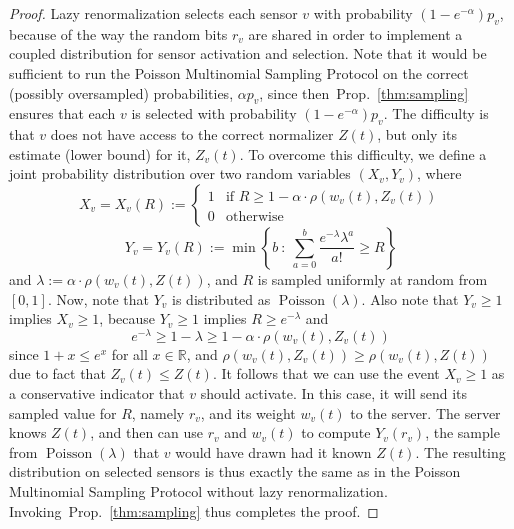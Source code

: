 \documentclass{sig-alternate-dan}
\numberwithin{equation}{section}
\newcommand{\sensor}{\ensuremath{v}}
\newcommand{\Poisson}[1]{\ensuremath{\operatorname{Poisson}({#1})}}
\newcommand{\LimitProtocol}[0]{Poisson Multinomial Sampling
  Protocol\xspace}
\newcommand{\propref}[1]{Prop.~\ref{#1}}
\newcommand{\reals}{\ensuremath{\mathbb{R}}}
\newcommand{\set}[1]{\ensuremath{\left\{#1\right\}}}
\begin{document}
{\begin{proof}
Lazy renormalization
selects each sensor $\sensor$ with probability
$(1-e^{-\alpha})p_{\sensor}$, because of the way the random bits
$r_{\sensor}$ are shared in order to implement a coupled distribution for
sensor activation and selection.
Note that it would be sufficient to run the \LimitProtocol on the correct (possibly
oversampled) probabilities, $\alpha p_{\sensor}$, 
since then~\propref{thm:sampling} ensures that each $\sensor$
is selected with probability $(1 - e^{-\alpha}) p_{\sensor}$.
The difficulty is that $\sensor$ does not have access to the correct
normalizer $Z(t)$, but only its estimate (lower bound) for it,
$Z_{\sensor}(t)$.
To overcome this difficulty, we define a joint probability
distribution over two random variables $(X_{\sensor},
Y_{\sensor})$, where 
\[
X_{\sensor}  = X_{\sensor}(R) := \left\{ 
\begin{array}{ll} 
1 & \text{if $R \ge 1 - \alpha \cdot\rho(w_{\sensor}(t), Z_{\sensor}(t))$} \\
0 & \text{otherwise}
\end{array}  \right.
\]
\[
Y_{\sensor} = Y_{\sensor}(R) := \min \set{b \ :\ \sum_{a=0}^b \frac{e^{-\lambda}
    \lambda^{a}}{a!} \ge R }
\]
and $\lambda := \alpha \cdot \rho(w_{\sensor}(t), Z(t))$, and $R$ is
sampled uniformly at random from $[0,1]$.
Now, note that $Y_{\sensor}$ is distributed as $\Poisson{\lambda}$.
Also note that $Y_{\sensor} \ge 1$ implies $X_{\sensor} \ge 1$,
because $Y_{\sensor} \ge 1$ implies $R \ge e^{-\lambda}$ and 
\[
 e^{-\lambda}  \ge 1 - \lambda \ge 1 - \alpha \cdot \rho(w_{\sensor}(t), Z_{\sensor}(t))
\]
since $1 + x \le e^x$ for all $x \in \reals$, and $\rho(w_{\sensor}(t),
Z_{\sensor}(t)) \ge \rho(w_{\sensor}(t), Z(t))$ due to fact
that $Z_{\sensor}(t) \le Z(t)$.
It follows that we can use the event $X_{\sensor} \ge 1$ as a
conservative indicator that $\sensor$ should activate.
In this case, it will send its sampled value for $R$, namely
$r_{\sensor}$, and its weight $w_{\sensor}(t)$ to the server.  
The server knows $Z(t)$, and then can
use $r_{\sensor}$ and $w_{\sensor}(t)$ to compute
$Y_{\sensor}(r_{\sensor})$, 
the sample from $\Poisson{\lambda}$ that $\sensor$ would have
drawn had it known $Z(t)$.  The resulting distribution on selected
sensors is thus exactly the same as in the \LimitProtocol without lazy
renormalization.
Invoking~\propref{thm:sampling} thus completes the proof.
\end{proof}

}
\end{document}
